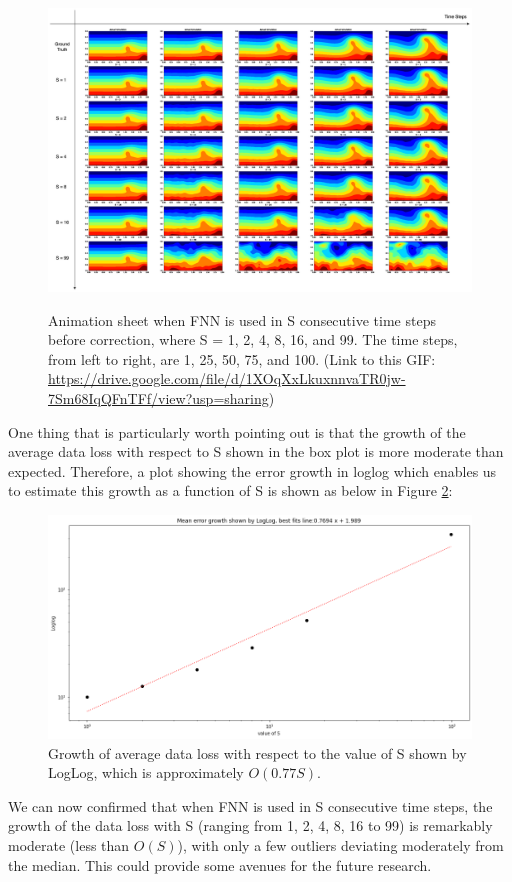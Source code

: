 \begin{figure}[H]
    \centering
    \caption{Animation sheet when FNN is used in S consecutive time steps before correction, where S = 1, 2, 4, 8, 16, and 99. The time steps, from left to right, are 1, 25, 50, 75, and 100. (Link to this GIF: \url{https://drive.google.com/file/d/1XOqXxLkuxnnvaTR0jw-7Sm68IqQFnTFf/view?usp=sharing})}
    \includegraphics[scale=0.30]{figures/mantle_convection_images/further_testings/FNN_further_testing_sheet.png}
    \label{figure:further_GIF}
\end{figure}

One thing that is particularly worth pointing out is that the growth of the average data loss with respect to S shown in the box plot is more moderate than expected. Therefore, a plot showing the error growth in loglog which enables us to estimate this growth as a function of S is shown as below in Figure \ref{figure:further_loglog}:

\begin{figure}[H]
    \centering
    \includegraphics[scale=0.4]{figures/mantle_convection_images/further_testings/FNN_LogLog.png}
    \caption{Growth of average data loss with respect to the value of S shown by LogLog, which is approximately $O(0.77S)$.}
    \label{figure:further_loglog}
\end{figure}

We can now confirmed that when FNN is used in S consecutive time steps, the growth of the data loss with S (ranging from 1, 2, 4, 8, 16 to 99) is remarkably moderate (less than $O(S)$), with only a few outliers deviating moderately from the median. This could provide some avenues for the future research.




